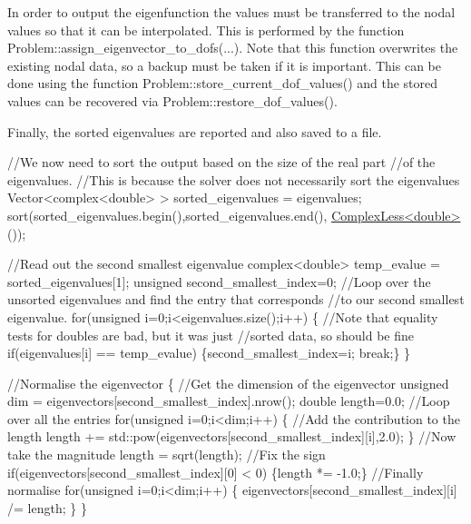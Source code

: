 In order to output the eigenfunction the values must be transferred to the nodal values so that it can be interpolated. This is performed by the function {\ttfamily Problem\+::assign\+\_\+eigenvector\+\_\+to\+\_\+dofs}(...). Note that this function overwrites the existing nodal data, so a backup must be taken if it is important. This can be done using the function {\ttfamily Problem\+::store\+\_\+current\+\_\+dof\+\_\+values()} and the stored values can be recovered via {\ttfamily Problem\+::restore\+\_\+dof\+\_\+values()}.

Finally, the sorted eigenvalues are reported and also saved to a file.


\begin{DoxyCodeInclude}

 \textcolor{comment}{//We now need to sort the output based on the size of the real part}
 \textcolor{comment}{//of the eigenvalues.}
 \textcolor{comment}{//This is because the solver does not necessarily sort the eigenvalues}
 Vector<complex<double> > sorted\_eigenvalues = eigenvalues;
 sort(sorted\_eigenvalues.begin(),sorted\_eigenvalues.end(),
      \hyperlink{classComplexLess}{ComplexLess<double>}());

 \textcolor{comment}{//Read out the second smallest eigenvalue}
 complex<double> temp\_evalue = sorted\_eigenvalues[1];
 \textcolor{keywordtype}{unsigned} second\_smallest\_index=0;
 \textcolor{comment}{//Loop over the unsorted eigenvalues and find the entry that corresponds}
 \textcolor{comment}{//to our second smallest eigenvalue.}
 \textcolor{keywordflow}{for}(\textcolor{keywordtype}{unsigned} i=0;i<eigenvalues.size();i++)
  \{
   \textcolor{comment}{//Note that equality tests for doubles are bad, but it was just}
   \textcolor{comment}{//sorted data, so should be fine}
   \textcolor{keywordflow}{if}(eigenvalues[i] == temp\_evalue) \{second\_smallest\_index=i; \textcolor{keywordflow}{break};\}
  \}

 \textcolor{comment}{//Normalise the eigenvector }
 \{
  \textcolor{comment}{//Get the dimension of the eigenvector}
  \textcolor{keywordtype}{unsigned} dim = eigenvectors[second\_smallest\_index].nrow();
  \textcolor{keywordtype}{double} length=0.0;
  \textcolor{comment}{//Loop over all the entries}
  \textcolor{keywordflow}{for}(\textcolor{keywordtype}{unsigned} i=0;i<dim;i++)
   \{
    \textcolor{comment}{//Add the contribution to the length}
    length += std::pow(eigenvectors[second\_smallest\_index][i],2.0);
   \}
  \textcolor{comment}{//Now take the magnitude}
  length = sqrt(length);
  \textcolor{comment}{//Fix the sign}
  \textcolor{keywordflow}{if}(eigenvectors[second\_smallest\_index][0] < 0) \{length *= -1.0;\}
  \textcolor{comment}{//Finally normalise}
  \textcolor{keywordflow}{for}(\textcolor{keywordtype}{unsigned} i=0;i<dim;i++)
   \{
    eigenvectors[second\_smallest\_index][i] /= length;
   \}
 \}


\end{DoxyCodeInclude}

